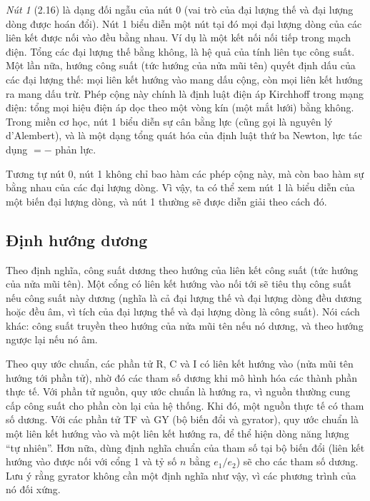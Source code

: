 \emph{Nút 1} (2.16) là dạng đối ngẫu của nút 0 (vai trò của đại lượng thế và đại lượng dòng được hoán đổi). Nút 1 biểu diễn một nút tại đó mọi đại lượng dòng của các liên kết được nối vào đều bằng nhau. Ví dụ là một kết nối nối tiếp trong mạch điện. Tổng các đại lượng thế bằng không, là hệ quả của tính liên tục công suất. Một lần nữa, hướng công suất (tức hướng của nửa mũi tên) quyết định dấu của các đại lượng thế: mọi liên kết hướng vào mang dấu cộng, còn mọi liên kết hướng ra mang dấu trừ. Phép cộng này chính là định luật điện áp Kirchhoff trong mạng điện: tổng mọi hiệu điện áp dọc theo một vòng kín (một mắt lưới) bằng không. Trong miền cơ học, nút 1 biểu diễn sự cân bằng lực (cũng gọi là nguyên lý d'Alembert), và là một dạng tổng quát hóa của định luật thứ ba Newton, lực tác dụng $=-$ phản lực.

Tương tự nút 0, nút 1 không chỉ bao hàm các phép cộng này, mà còn bao hàm sự bằng nhau của các đại lượng dòng. Vì vậy, ta có thể xem nút 1 là biểu diễn của một biến đại lượng dòng, và nút 1 thường sẽ được diễn giải theo cách đó.

\subsection{Định hướng dương}
Theo định nghĩa, công suất dương theo hướng của liên kết công suất (tức hướng của nửa mũi tên). Một cổng có liên kết hướng vào nối tới sẽ tiêu thụ công suất nếu công suất này dương (nghĩa là cả đại lượng thế và đại lượng dòng
đều dương hoặc đều âm, vì tích của đại lượng thế và đại lượng dòng là công suất). Nói cách khác: công suất truyền theo hướng của nửa mũi tên nếu nó dương, và theo hướng ngược lại nếu nó âm.

Theo quy ước chuẩn, các phần tử R, C và I có liên kết hướng vào (nửa mũi tên hướng tới phần tử), nhờ đó các tham số dương khi mô hình hóa các thành phần thực tế. Với phần tử nguồn, quy ước chuẩn là hướng ra, vì nguồn thường cung cấp công suất cho phần còn lại của hệ thống. Khi đó, một nguồn thực tế có tham số dương. Với các phần tử TF và GY (bộ biến đổi và gyrator), quy ước chuẩn là một liên kết hướng vào và một liên kết hướng ra, để thể hiện dòng năng lượng ``tự nhiên''. Hơn nữa, dùng định nghĩa chuẩn của tham số tại bộ biến đổi (liên kết hướng vào được nối với cổng 1 và tỷ số $n$ bằng $e_1/e_2$) sẽ cho các tham số dương. Lưu ý rằng gyrator không cần một định nghĩa như vậy, vì các phương trình của nó đối xứng.

